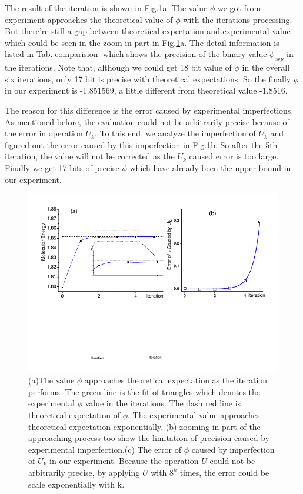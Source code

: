 \def\CTeXPreproc{Created by ctex v0.2.12, don't edit!}\documentclass[twocolumn,showpacs,twoside,10pt,superscriptaddress,prl]{revtex4}
\begin{document}
The result of the iteration is shown in Fig.\ref{expresult}a. The
value $\phi$ we got from experiment approaches the theoretical value
of $\phi$ with the iterations processing. But there're still a gap
between theoretical expectation and experimental value which could
be seen in the zoom-in part in Fig.\ref{expresult}a. The detail
information is listed in Tab.\ref{comparision} which shows the
precision of the binary value $\phi_{exp}$ in the iterations. Note
that, although we could get 18 bit value of $\phi$ in the overall
six iterations, only 17 bit is precise with theoretical
expectations. So the finally $\phi$ in our experiment is -1.851569,
a little different from theoretical value -1.8516.

The reason for this difference is the error caused by experimental
imperfections. As mentioned before, the evaluation could not be
arbitrarily precise because of the error in operation $U_k$. To this
end, we analyze the imperfection of $U_k$ and figured out the error
caused by this imperfection in Fig.\ref{expresult}b. So after the
5th iteration, the value will not be corrected as the $U_k$ caused
error is too large. Finally we get 17 bits of precise $\phi$ which
have already been the upper bound in our experiment.

\begin{figure}[htb]
\begin{center}
\includegraphics[width= 0.99\columnwidth]{expresult}
\end{center}
\caption{(a)The value $\phi$ approaches theoretical expectation as
the iteration performs. The green line is the fit of triangles which
denotes the experimental $\phi$ value in the iterations. The dash
red line is theoretical expectation of $\phi$. The experimental
value approaches theoretical expectation exponentially. (b) zooming
in part of the approaching process too show the limitation of
precision caused by experimental imperfection.(c) The error of
$\phi$ caused by imperfection of $U_k$ in our experiment. Because
the operation $U$ could not be arbitrarily precise, by applying $U$
with $8^k$ times, the error could be scale exponentially with
k.}\label{expresult}
\end{figure}
\end{document}
